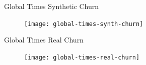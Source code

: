 \begin{frame}{Global Times Synthetic Churn}
	\begin{figure}
		\texttt{[image: global-times-synth-churn]}
	\end{figure}
\end{frame}

\begin{frame}{Global Times Real Churn}
	\begin{figure}
		\texttt{[image: global-times-real-churn]}
	\end{figure}
\end{frame}





